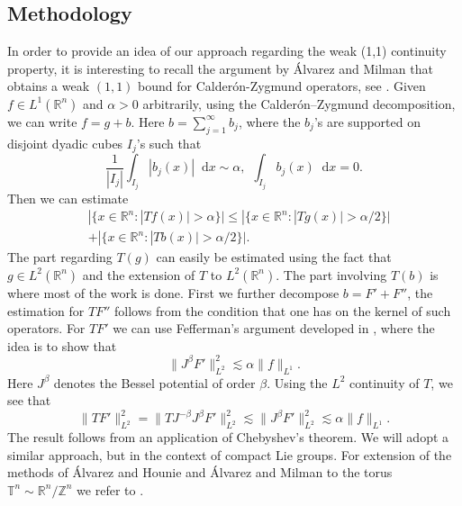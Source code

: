 \documentclass[12pt, reqno]{amsart}
\theoremstyle{definition}
\theoremstyle{remark}
\numberwithin{equation}{section}
\newcommand*\diff{\mathop{}\!\mathrm{d}}
\begin{document}
 \subsection{Methodology} In order 
to provide an idea of our approach regarding the weak (1,1) continuity property, it is interesting to recall the argument by Álvarez and Milman that obtains a weak $(1,1)$ bound for Calderón-Zygmund operators, see \cite[Theorem 4.1]{2}. Given $f\in L^1(\mathbb{R}^n)$ and $\alpha>0$ arbitrarily, using the Calderón–Zygmund decomposition, we can write $f=g+b$. Here $b=\sum_{j=1}^{\infty}b_j$, where the $b_j$'s are supported on disjoint dyadic cubes $I_j$'s such that 
\begin{equation*}
    \frac{1}{|I_j|}\int_{I_j}|b_j(x)|\diff{x}\sim\alpha,\hspace{5pt}\int_{I_j}b_j(x)\diff{x}=0.
\end{equation*}
Then we can estimate
\begin{eqnarray*}
     &|\{x\in\mathbb{R}^n:|Tf(x)|>\alpha\}|\leq|\{x\in\mathbb{R}^n:|Tg(x)|>\alpha/2\}|\\
     &+|\{x\in\mathbb{R}^n:|Tb(x)|>\alpha/2\}|.
\end{eqnarray*}
The part regarding $T(g)$ can easily be estimated using the fact that $g\in L^2(\mathbb{R}^n)$ and the extension of $T$ to $L^2(\mathbb{R}^n)$. The part involving $T(b)$ is where most of the work is done. First we further decompose $b=F'+F''$, the estimation for $TF''$ follows from the condition that one has on the kernel of such operators. For $TF'$ we can use Fefferman's argument developed in \cite{10}, where the idea is to show that
\begin{equation*}
    \|J^\beta F'\|^{2}_{L^2}\lesssim\alpha\|f\|_{L^1}.
\end{equation*}
Here $J^\beta$ denotes the Bessel potential of order $\beta$. Using the $L^2$ continuity of $T$, we see that
\begin{equation*}
    \|TF'\|^2_{L^2}=\|TJ^{-\beta}J^\beta F'\|^{2}_{L^2}\lesssim\|J^\beta F'\|^{2}_{L^2}\lesssim\alpha\|f\|_{L^1}.
\end{equation*}
The result follows from an application of Chebyshev's theorem. We will adopt a similar approach, but in the context of compact Lie groups. For extension of the methods of \'Alvarez and Hounie \cite{1} and \'Alvarez and Milman \cite{2} to the torus $\mathbb{T}^n\sim \mathbb{R}^n/\mathbb{Z}^n $ we refer to \cite{Cardona:Martinez}.
\end{document}
